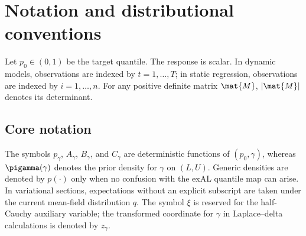 \section{Notation and distributional conventions}
\label{sec:supp_distributional_conventions}

Let $p_0\in(0,1)$ be the target quantile. The response is scalar. In dynamic
models, observations are indexed by $t=1,\ldots,T$; in static regression,
observations are indexed by $i=1,\ldots,n$. For any positive definite matrix
$\mat{M}$, $|\mat{M}|$ denotes its determinant.

\subsection{Core notation}

The symbols $p_\gamma$, $A_\gamma$, $B_\gamma$, and $C_\gamma$ are deterministic
functions of $(p_0,\gamma)$, whereas $\pigamma(\gamma)$ denotes the prior
density for $\gamma$ on $(L,U)$. Generic densities are denoted by $p(\cdot)$
only when no confusion with the exAL quantile map can arise. In variational
sections, expectations without an explicit subscript are taken under the
current mean-field distribution $q$. The symbol $\xi$ is reserved for the
 half-Cauchy auxiliary variable; the transformed coordinate for $\gamma$
in Laplace--delta calculations is denoted by $z_\gamma$.

